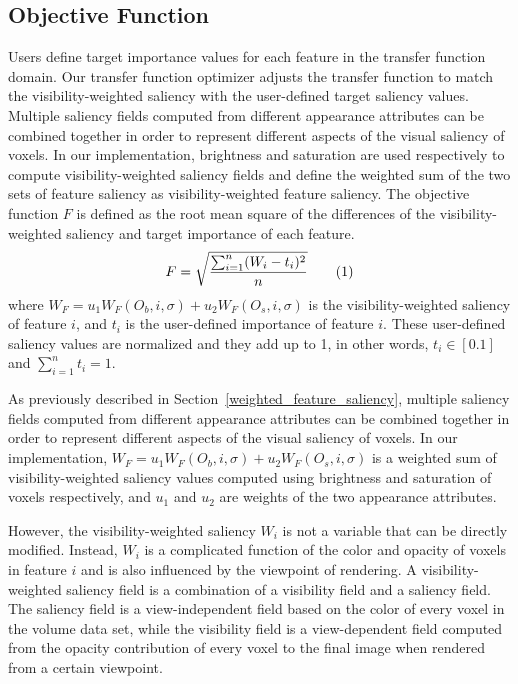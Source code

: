 
\subsection{Objective Function}
Users define target importance values for each feature in the transfer function domain.
Our transfer function optimizer adjusts the transfer function to match the visibility-weighted saliency with the user-defined target saliency values.
Multiple saliency fields computed from different appearance attributes can be combined together in order to represent different aspects of the visual saliency of voxels.
In our implementation, brightness and saturation are used respectively to compute visibility-weighted saliency fields and define the weighted sum of the two sets of feature saliency as visibility-weighted feature saliency.
The objective function $ F $ is defined as the root mean square of the differences of the visibility-weighted saliency and target importance of each feature.
\[ F=\sqrt{ \frac{\sum_{i=1}^{n} (W_{i}-t_{i})^{2}}{n} } 
\addtag \]
where $ W_{F}=u_{1}W_{F}(O_{b},i,\sigma)+u_{2}W_{F}(O_{s},i,\sigma) $ is the visibility-weighted saliency of feature $ i $, and $ t_{i} $ is the user-defined importance of feature $ i $. These user-defined saliency values are normalized and they add up to 1, in other words, $ t_{i} \in [0.1] $ and $ \sum_{i=1}^{n} t_{i} = 1 $.

As previously described in Section~\ref{weighted_feature_saliency}, multiple saliency fields computed from different appearance attributes can be combined together in order to represent different aspects of the visual saliency of voxels.
In our implementation, $ W_{F}=u_{1}W_{F}(O_{b},i,\sigma)+u_{2}W_{F}(O_{s},i,\sigma) $ is a weighted sum of visibility-weighted saliency values computed using brightness and saturation of voxels respectively, and $ u_{1} $ and $ u_{2} $ are weights of the two appearance attributes.

However, the visibility-weighted saliency $ W_{i} $ is not a variable that can be directly modified. Instead, $ W_{i} $ is a complicated function of the color and opacity of voxels in feature $ i $ and is also influenced by the viewpoint of rendering. A visibility-weighted saliency field is a combination of a visibility field and a saliency field. The saliency field is a view-independent field based on the color of every voxel in the volume data set, while the visibility field is a view-dependent field computed from the opacity contribution of every voxel to the final image when rendered from a certain viewpoint.

